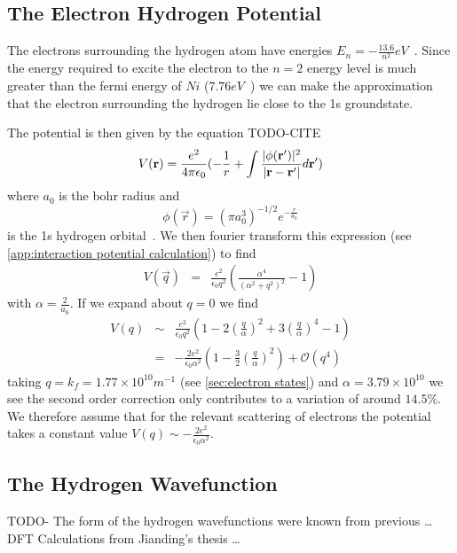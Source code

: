 \subsection{The Electron Hydrogen Potential}

The electrons surrounding the hydrogen
atom have energies
\(E_n = -\frac{13.6}{n^2} eV\)~\cite{griffiths_schroeter_2018}.
Since the energy required to excite the electron
to the \(n=2\) energy level is much greater
than the fermi energy of \(Ni\)
(\(7.76eV\)~\cite{PhysRev.131.2469}) we can
make the approximation that the electron surrounding
the hydrogen lie close to the 1s groundstate.

The potential is then given by the equation TODO-CITE
\begin{equation}
    V(\mathbf{r}) = \frac{e^2}{4 \pi \epsilon_0}(
    -\frac{1}{r}
    + \int{\frac{\lvert\phi(\mathbf{r}')\rvert^2}{
            \lvert\mathbf{r} - \mathbf{r'}\rvert} d\mathbf{r}'})
\end{equation}
where \(a_0\) is
the bohr radius and
\begin{equation}
    \phi(\vec{r}) = {(\pi a_0^3)}^{-1/2} e^{-\frac{r}{a_0}}
\end{equation}
is the 1s hydrogen orbital~\cite{griffiths_schroeter_2018}.
We then fourier
transform this expression
(see \cref{app:interaction potential calculation})
to find
\begin{eqnarray}
    V(\vec{q}) &=& \frac{e^2}{\epsilon_0 q^2}(
    \frac{\alpha^4}{{(\alpha^2 + q^2)}^2} - 1
    )
\end{eqnarray}
with \(\alpha = \frac{2}{a_0}\). If we expand
about \(q=0\) we find
\begin{eqnarray}
    V(q) &\sim&\frac{e^2}{\epsilon_0 q^2}(1 - 2{(\frac{q}{\alpha})}^2 + 3 {(\frac{q}{\alpha})}^4 - 1)\\
    {} &=& -\frac{2e^2}{\epsilon_0 \alpha^2}(1 - \frac{3}{2}{(\frac{q}{\alpha})}^2) + \mathcal{O}(q^4)
\end{eqnarray}
taking \(q = k_f = 1.77\times{}10^{10}m^{-1}\)
(see \cref{sec:electron states})
and \(\alpha = 3.79\times{}10^{10}\) we see the second
order correction only contributes to a variation
of around \(14.5\% \).
We therefore assume that for the relevant scattering
of electrons the potential takes a constant
value \(V(q) \sim -\frac{2e^2}{\epsilon_0 \alpha^2}\).

\subsection{The Hydrogen Wavefunction}
TODO-
The form of the hydrogen wavefunctions were
known from previous \ldots DFT Calculations from Jianding's thesis \ldots


